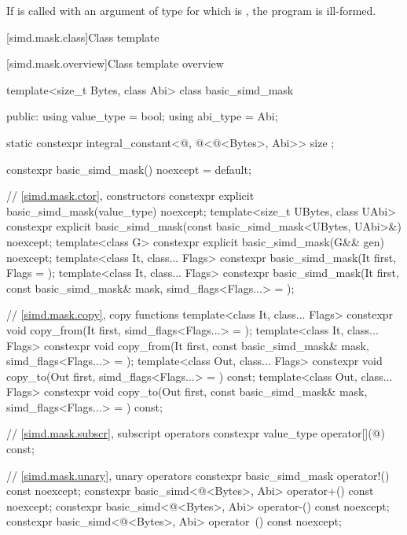 \pnum
If  is called with an argument of type  for which
 is , the program is ill-formed.

[simd.mask.class]{Class template }

[simd.mask.overview]{Class template  overview}

\begin{codeblock}
template<size_t Bytes, class Abi> class basic_simd_mask {
public:
  using value_type = bool;
  using abi_type = Abi;

  static constexpr integral_constant<@\simdsizetype@, @\simdsizev@<@\integerfrom@<Bytes>, Abi>> size {};

  constexpr basic_simd_mask() noexcept = default;

  // \ref{simd.mask.ctor},  constructors
  constexpr explicit basic_simd_mask(value_type) noexcept;
  template<size_t UBytes, class UAbi>
    constexpr explicit basic_simd_mask(const basic_simd_mask<UBytes, UAbi>&) noexcept;
  template<class G> constexpr explicit basic_simd_mask(G&& gen) noexcept;
  template<class It, class... Flags>
    constexpr basic_simd_mask(It first, Flags = {});
  template<class It, class... Flags>
    constexpr basic_simd_mask(It first, const basic_simd_mask& mask, simd_flags<Flags...> = {});

  // \ref{simd.mask.copy},  copy functions
  template<class It, class... Flags>
    constexpr void copy_from(It first, simd_flags<Flags...> = {});
  template<class It, class... Flags>
    constexpr void copy_from(It first, const basic_simd_mask& mask, simd_flags<Flags...> = {});
  template<class Out, class... Flags>
    constexpr void copy_to(Out first, simd_flags<Flags...> = {}) const;
  template<class Out, class... Flags>
    constexpr void copy_to(Out first, const basic_simd_mask& mask, simd_flags<Flags...> = {}) const;

  // \ref{simd.mask.subscr},  subscript operators
  constexpr value_type operator[](@\simdsizetype@) const;

  // \ref{simd.mask.unary},  unary operators
  constexpr basic_simd_mask operator!() const noexcept;
  constexpr basic_simd<@\integerfrom@<Bytes>, Abi> operator+() const noexcept;
  constexpr basic_simd<@\integerfrom@<Bytes>, Abi> operator-() const noexcept;
  constexpr basic_simd<@\integerfrom@<Bytes>, Abi> operator~() const noexcept;

}
\end{codeblock}
